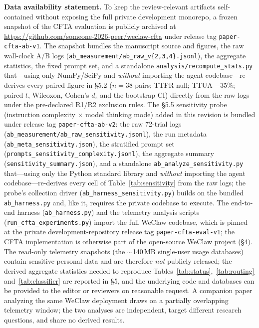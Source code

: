 \documentclass[numbered,mediumone,traditional]{oup-authoring-template}
\begin{document}
\textbf{Data availability statement.} To keep the review-relevant artifacts self-contained without exposing the full private development monorepo, a frozen snapshot of the CFTA evaluation is publicly archived at \url{https://github.com/someone-2026-peer/weclaw-cfta} under release tag \texttt{paper-cfta-ab-v1}. The snapshot bundles the manuscript source and figures, the raw wall-clock A/B logs (\texttt{ab\_measurement/ab\_raw\_v\{2,3,4\}.jsonl}), the aggregate statistics, the fixed prompt set, and a standalone \texttt{analysis/recompute\_stats.py} that---using only NumPy/SciPy and \emph{without} importing the agent codebase---re-derives every paired figure in \S5.2 ($n = 38$ pairs; TTFR null; TTUA $-35\%$; paired $t$, Wilcoxon, Cohen's $d_z$ and the bootstrap CI) directly from the raw logs under the pre-declared R1/R2 exclusion rules. The \S5.5 sensitivity probe (instruction complexity $\times$ model thinking mode) added in this revision is bundled under release tag \texttt{paper-cfta-ab-v2}: the raw 72-trial logs (\texttt{ab\_measurement/ab\_raw\_sensitivity.jsonl}), the run metadata (\texttt{ab\_meta\_sensitivity.json}), the stratified prompt set (\texttt{prompts\_sensitivity\_complexity.jsonl}), the aggregate summary (\texttt{sensitivity\_summary.json}), and a standalone \texttt{ab\_analyze\_sensitivity.py} that---using only the Python standard library and \emph{without} importing the agent codebase---re-derives every cell of Table~\ref{tab:sensitivity} from the raw logs; the probe's collection driver (\texttt{ab\_harness\_sensitivity.py}) builds on the bundled \texttt{ab\_harness.py} and, like it, requires the private codebase to execute. The end-to-end harness (\texttt{ab\_harness.py}) and the telemetry analysis scripts (\texttt{run\_cfta\_experiments.py}) import the full WeClaw codebase, which is pinned at the private development-repository release tag \texttt{paper-cfta-eval-v1}; the CFTA implementation is otherwise part of the open-source WeClaw project (\S4). The read-only telemetry snapshots (the $\sim$140\,MB single-user usage databases) contain sensitive personal data and are therefore \emph{not} publicly released; the derived aggregate statistics needed to reproduce Tables~\ref{tab:status},~\ref{tab:routing} and~\ref{tab:classifier} are reported in \S5, and the underlying code and databases can be provided to the editor or reviewers on reasonable request. A companion paper analyzing the same WeClaw deployment draws on a partially overlapping telemetry window; the two analyses are independent, target different research questions, and share no derived results.
\end{document}
